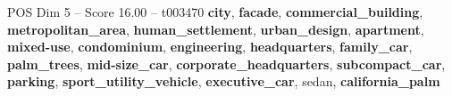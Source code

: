\begin{textsample}{POS Dim 5 – Score 16.00 – t003470}  \label{ex:f5_pos_024}
\textbf{city}, \textbf{facade}, \textbf{commercial\_building}, \textbf{metropolitan\_area}, \textbf{human\_settlement}, \textbf{urban\_design}, \textbf{apartment}, \textbf{mixed-use}, \textbf{condominium}, \textbf{engineering}, \textbf{headquarters}, \textbf{family\_car}, \textbf{palm\_trees}, \textbf{mid-size\_car}, \textbf{corporate\_headquarters}, \textbf{subcompact\_car}, \textbf{parking}, \textbf{sport\_utility\_vehicle}, \textbf{executive\_car}, sedan, \textbf{california\_palm}

\end{textsample}
